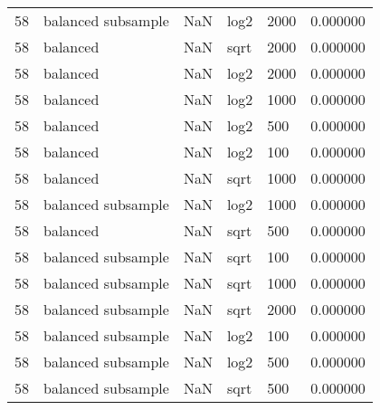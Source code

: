 \documentclass[
    iict, %
    il, %
]{heig-tb}
\begin{document}
\begin{table}[H]
\begin{center}
\begin{tabular}{llllll}
            58   & balanced subsample & NaN       & log2         & 2000         & 0.000000 \\
            58   & balanced           & NaN       & sqrt         & 2000         & 0.000000 \\
            58   & balanced           & NaN       & log2         & 2000         & 0.000000 \\
            58   & balanced           & NaN       & log2         & 1000         & 0.000000 \\
            58   & balanced           & NaN       & log2         & 500          & 0.000000 \\
            58   & balanced           & NaN       & log2         & 100          & 0.000000 \\
            58   & balanced           & NaN       & sqrt         & 1000         & 0.000000 \\
            58   & balanced subsample & NaN       & log2         & 1000         & 0.000000 \\
            58   & balanced           & NaN       & sqrt         & 500          & 0.000000 \\
            58   & balanced subsample & NaN       & sqrt         & 100          & 0.000000 \\
            58   & balanced subsample & NaN       & sqrt         & 1000         & 0.000000 \\
            58   & balanced subsample & NaN       & sqrt         & 2000         & 0.000000 \\
            58   & balanced subsample & NaN       & log2         & 100          & 0.000000 \\
            58   & balanced subsample & NaN       & log2         & 500          & 0.000000 \\
            58   & balanced subsample & NaN       & sqrt         & 500          & 0.000000
        \end{tabular}
    \end{center}
\end{table}


\let\cleardoublepage\clearpage
\backmatter

\label{glossaire}
\printnoidxglossary
\label{index}
\printindex

%
\end{document}
